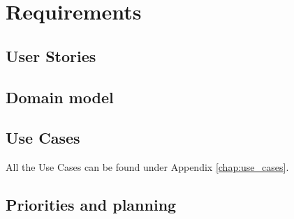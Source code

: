 \chapter{Requirements}

\section{User Stories}


\section{Domain model}


\section{Use Cases}

All the Use Cases can be found under Appendix \autoref{chap:use_cases}.

\section{Priorities and planning}\label{sec:prio_and_planning}




